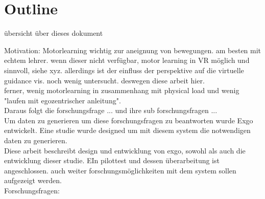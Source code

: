 \section{Outline}
übersicht über dieses dokument
\exgo


Motivation: Motorlearning wichtig zur aneignung von bewegungen. am besten mit echtem lehrer. wenn dieser nicht verfügbar, motor learning in VR möglich und sinnvoll, siehe xyz. allerdings ist der einfluss der perspektive auf die virtuelle guidance vis. noch wenig untersucht. deswegen diese arbeit hier.\\
ferner, wenig motorlearning in zusammenhang mit physical load und wenig "laufen mit egozentrischer anleitung".\\
Daraus folgt die forschungsfrage ... und ihre sub forschungsfragen ...\\
Um daten zu generieren um diese forschungsfragen zu beantworten wurde Exgo entwickelt. Eine studie wurde designed um mit diesem system die notwendigen daten zu generieren.\\
Diese arbeit beschreibt design und entwicklung von exgo, sowohl als auch die entwicklung dieser studie. EIn pilottest und dessen überarbeitung ist angeschlossen. auch weiter forschungsmöglichkeiten mit dem system sollen aufgezeigt werden.\\
Forschungsfragen:\\